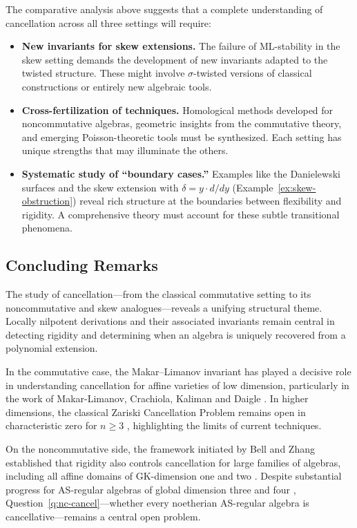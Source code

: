 \documentclass{amsart}
\theoremstyle{plain}
\numberwithin{theorem}{section}
\numberwithin{equation}{theorem}
\theoremstyle{definition}
\begin{document}
The comparative analysis above suggests that a complete understanding of cancellation across all three settings will require:

\begin{itemize}
\item \textbf{New invariants for skew extensions.} The failure of ML-stability in the skew setting demands the development of new invariants adapted to the twisted structure. These might involve $\sigma$-twisted versions of classical constructions or entirely new algebraic tools.

\item \textbf{Cross-fertilization of techniques.} Homological methods developed for noncommutative algebras, geometric insights from the commutative theory, and emerging Poisson-theoretic tools must be synthesized. Each setting has unique strengths that may illuminate the others.

\item \textbf{Systematic study of ``boundary cases.''} Examples like the Danielewski surfaces  and the skew extension with $\delta = y \cdot d/dy$ (Example~\ref{ex:skew-obstruction}) reveal rich structure at the boundaries between flexibility and rigidity. A comprehensive theory must account for these subtle transitional phenomena.
\end{itemize}

\subsection*{Concluding Remarks}

The study of cancellation—from the classical commutative setting to its noncommutative and skew analogues—reveals a unifying structural theme. Locally nilpotent derivations and their associated invariants remain central in detecting rigidity and determining when an algebra is uniquely recovered from a polynomial extension.

In the commutative case, the Makar--Limanov invariant has played a decisive role in understanding cancellation for affine varieties of low dimension, particularly in the work of Makar-Limanov, Crachiola, Kaliman and Daigle \cite{Crachiola2009,CM2,CM,Daigle1996, Da,KalimanMakarLimanov1997,KalimanMakarLimanov2007,MakarLimanov2001,ML}. In higher dimensions, the classical Zariski Cancellation Problem remains open in characteristic zero for $n\geq 3$ \cite{Gu3}, highlighting the limits of current techniques.

On the noncommutative side, the framework initiated by Bell and Zhang \cite{BellZhang2017} established that rigidity also controls cancellation for large families of algebras, including all affine domains of GK-dimension one and two \cite{BHHV, BellZhang2017}. Despite substantial progress for AS-regular algebras of global dimension three and four \cite{TVZ, LMZ}, Question~\ref{q:nc-cancel}—whether every noetherian AS-regular algebra is cancellative—remains a central open problem.
\end{document}
